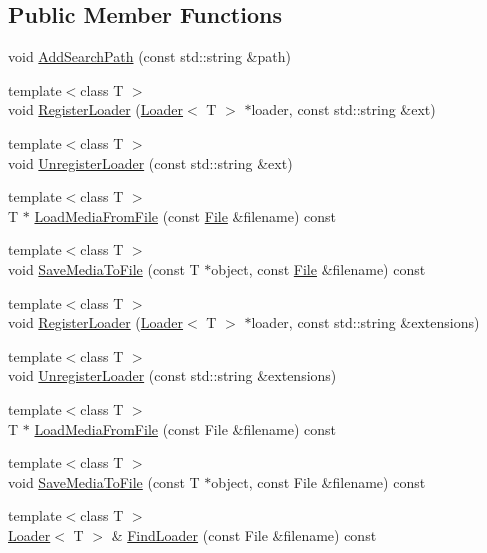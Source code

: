 \subsection*{Public Member Functions}
\begin{DoxyCompactItemize}
\item 
void \hyperlink{class_agmd_1_1_media_manager_a7a4ae5891301a5feeabe562bc090f3aa}{Add\+Search\+Path} (const std\+::string \&path)
\item 
{\footnotesize template$<$class T $>$ }\\void \hyperlink{class_agmd_1_1_media_manager_a3304ce9c6606b20e4580ac5f0207f0f6}{Register\+Loader} (\hyperlink{class_agmd_1_1_loader}{Loader}$<$ T $>$ $\ast$loader, const std\+::string \&ext)
\item 
{\footnotesize template$<$class T $>$ }\\void \hyperlink{class_agmd_1_1_media_manager_afaeb845bca3c51e343b1c876d8bb2206}{Unregister\+Loader} (const std\+::string \&ext)
\item 
{\footnotesize template$<$class T $>$ }\\T $\ast$ \hyperlink{class_agmd_1_1_media_manager_ae4602b1d6e9800cf24b8338dbb6e50b8}{Load\+Media\+From\+File} (const \hyperlink{class_agmd_utilities_1_1_file}{File} \&filename) const 
\item 
{\footnotesize template$<$class T $>$ }\\void \hyperlink{class_agmd_1_1_media_manager_ab22eb919b859ef579579c581197e3cee}{Save\+Media\+To\+File} (const T $\ast$object, const \hyperlink{class_agmd_utilities_1_1_file}{File} \&filename) const 
\item 
{\footnotesize template$<$class T $>$ }\\void \hyperlink{class_agmd_1_1_media_manager_a9ba4f233ac1bef692d0a2673ca4b5ee4}{Register\+Loader} (\hyperlink{class_agmd_1_1_loader}{Loader}$<$ T $>$ $\ast$loader, const std\+::string \&extensions)
\item 
{\footnotesize template$<$class T $>$ }\\void \hyperlink{class_agmd_1_1_media_manager_a9a9c931457fcff02256b43a5ea10bc99}{Unregister\+Loader} (const std\+::string \&extensions)
\item 
{\footnotesize template$<$class T $>$ }\\T $\ast$ \hyperlink{class_agmd_1_1_media_manager_aebc8cb7b588f17f589430417fe68d56e}{Load\+Media\+From\+File} (const File \&filename) const 
\item 
{\footnotesize template$<$class T $>$ }\\void \hyperlink{class_agmd_1_1_media_manager_ab22eb919b859ef579579c581197e3cee}{Save\+Media\+To\+File} (const T $\ast$object, const File \&filename) const 
\item 
{\footnotesize template$<$class T $>$ }\\\hyperlink{class_agmd_1_1_loader}{Loader}$<$ T $>$ \& \hyperlink{class_agmd_1_1_media_manager_a137720775d2b24100276a2414e211378}{Find\+Loader} (const File \&filename) const 
\end{DoxyCompactItemize}
